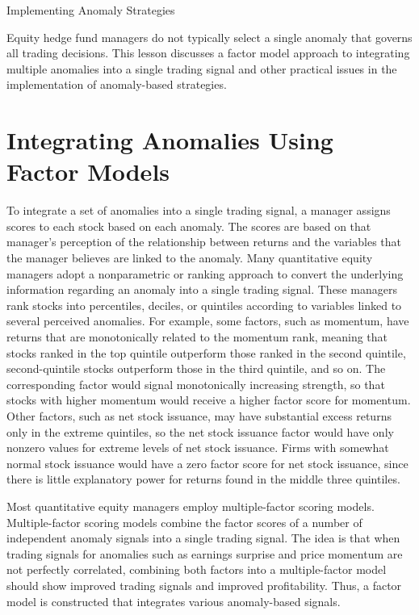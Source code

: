 \documentclass[11pt]{article}
\begin{document}
Implementing Anomaly Strategies

Equity hedge fund managers do not typically select a single anomaly that governs all trading decisions. This lesson discusses a factor model approach to integrating multiple anomalies into a single trading signal and other practical issues in the implementation of anomaly-based strategies.

\section*{Integrating Anomalies Using Factor Models}
To integrate a set of anomalies into a single trading signal, a manager assigns scores to each stock based on each anomaly. The scores are based on that manager's perception of the relationship between returns and the variables that the manager believes are linked to the anomaly. Many quantitative equity managers adopt a nonparametric or ranking approach to convert the underlying information regarding an anomaly into a single trading signal. These managers rank stocks into percentiles, deciles, or quintiles according to variables linked to several perceived anomalies. For example, some factors, such as momentum, have returns that are monotonically related to the momentum rank, meaning that stocks ranked in the top quintile outperform those ranked in the second quintile, second-quintile stocks outperform those in the third quintile, and so on. The corresponding factor would signal monotonically increasing strength, so that stocks with higher momentum would receive a higher factor score for momentum. Other factors, such as net stock issuance, may have substantial excess returns only in the extreme quintiles, so the net stock issuance factor would have only nonzero values for extreme levels of net stock issuance. Firms with somewhat normal stock issuance would have a zero factor score for net stock issuance, since there is little explanatory power for returns found in the middle three quintiles.

Most quantitative equity managers employ multiple-factor scoring models. Multiple-factor scoring models combine the factor scores of a number of independent anomaly signals into a single trading signal. The idea is that when trading signals for anomalies such as earnings surprise and price momentum are not perfectly correlated, combining both factors into a multiple-factor model should show improved trading signals and improved profitability. Thus, a factor model is constructed that integrates various anomaly-based signals.
\end{document}
